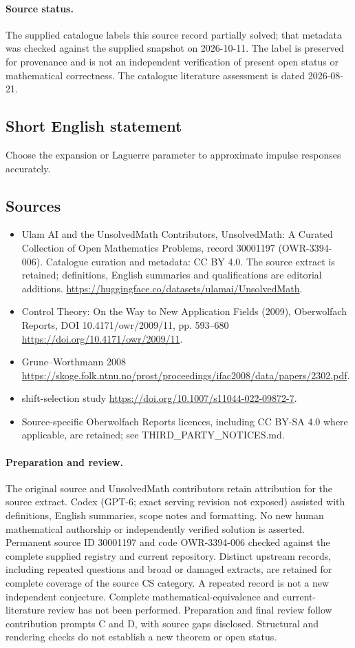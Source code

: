 \documentclass[11pt]{article}
\begin{document}
\paragraph{Source status.}
The supplied catalogue labels this source record partially solved; that metadata was checked against the supplied snapshot on 2026-10-11. The label is preserved for provenance and is not an independent verification of present open status or mathematical correctness. The catalogue literature assessment is dated 2026-08-21.
\subsection{Short English statement}
Choose the expansion or Laguerre parameter to approximate impulse responses accurately.
\subsection{Sources}
\begin{itemize}
\item[S1] Ulam AI and the UnsolvedMath Contributors, UnsolvedMath: A Curated Collection of Open Mathematics Problems, record 30001197 (OWR-3394-006). Catalogue curation and metadata: CC BY 4.0. The source extract is retained; definitions, English summaries and qualifications are editorial additions.
\url{https://huggingface.co/datasets/ulamai/UnsolvedMath}.
\item[S2] Control Theory: On the Way to New Application Fields (2009), Oberwolfach Reports, DOI 10.4171/owr/2009/11, pp. 593--680
\url{https://doi.org/10.4171/owr/2009/11}.
\item[S3] Grune--Worthmann 2008
\url{https://skoge.folk.ntnu.no/prost/proceedings/ifac2008/data/papers/2302.pdf}.
\item[S4] shift-selection study
\url{https://doi.org/10.1007/s11044-022-09872-7}.
\item Source-specific Oberwolfach Reports licences, including CC BY-SA 4.0 where applicable, are retained; see THIRD\_PARTY\_NOTICES.md.
\end{itemize}
\paragraph{Preparation and review.}
The original source and UnsolvedMath contributors retain attribution for the source extract. Codex (GPT-6; exact serving revision not exposed) assisted with definitions, English summaries, scope notes and formatting. No new human mathematical authorship or independently verified solution is asserted. Permanent source ID 30001197 and code OWR-3394-006 checked against the complete supplied registry and current repository. Distinct upstream records, including repeated questions and broad or damaged extracts, are retained for complete coverage of the source CS category. A repeated record is not a new independent conjecture. Complete mathematical-equivalence and current-literature review has not been performed. Preparation and final review follow contribution prompts C and D, with source gaps disclosed. Structural and rendering checks do not establish a new theorem or open status.
\label{end:30001197}
\end{document}
